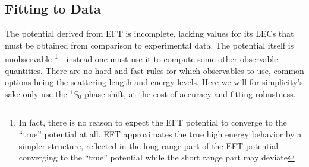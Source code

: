 
\subsection{Fitting to Data}

The potential derived from EFT is incomplete, lacking values for its LECs that
must be obtained from comparison to experimental data. The potential itself is
unobservable \footnote{In fact, there is no reason to expect the EFT potential to converge to
  the ``true'' potential at all. EFT approximates the true high energy behavior
  by a simpler structure, reflected in the long range part of the EFT potential
  converging to the ``true'' potential while the short range part may deviate\cite[p.~17]{lepage1997renormalize}}
- instead one must use it to compute some other observable
quantities. There are no hard and fast rules for which observables to use,
common options being the scattering length and energy levels. Here we
will for simplicity's sake only use the \(^{1}S_{0}\) phase shift, at the cost
of accuracy and fitting robustness. 



